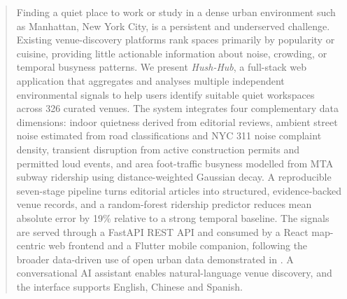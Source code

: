 \documentclass[conference]{IEEEtran}
\begin{document}

\begin{abstract}
Finding a quiet place to work or study in a dense urban environment such as Manhattan,
New York City, is a persistent and underserved challenge. Existing venue-discovery
platforms rank spaces primarily by popularity or cuisine, providing little actionable
information about noise, crowding, or temporal busyness patterns. We present
\textit{Hush-Hub}, a full-stack web application that aggregates and analyses multiple
independent environmental signals to help users identify suitable quiet workspaces across
326 curated venues. The system integrates four complementary data dimensions: indoor
quietness derived from editorial reviews, ambient street noise estimated from road
classifications and NYC 311 noise complaint density, transient disruption from active
construction permits and permitted loud events, and area foot-traffic busyness modelled
from MTA subway ridership using distance-weighted Gaussian decay. A reproducible
seven-stage pipeline turns editorial articles into structured, evidence-backed venue
records, and a random-forest ridership predictor reduces mean absolute error by 19\%
relative to a strong temporal baseline. The signals are served through a FastAPI REST
API and consumed by a React map-centric web frontend and a Flutter mobile companion,
following the broader data-driven use of open urban data demonstrated in
\cite{deng2020walkability}. A conversational AI assistant enables natural-language venue
discovery, and the interface supports English, Chinese and Spanish.
\end{abstract}
\end{document}
